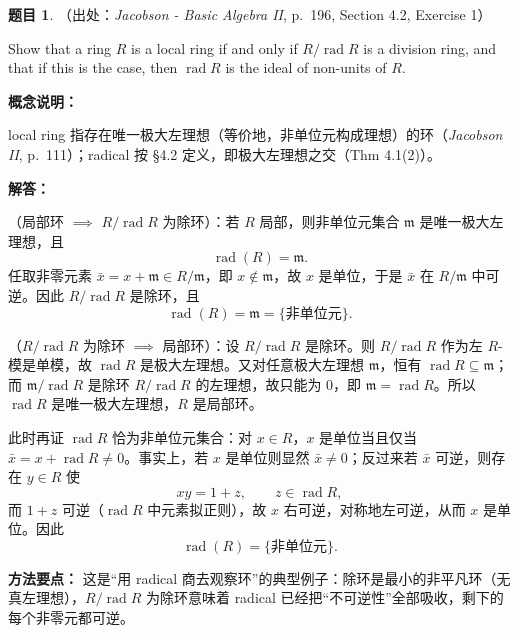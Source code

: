 \documentclass[a4paper]{ctexart}
\theoremstyle{definition}
\newtheorem{example}{题目}[section]
\theoremstyle{analysis}
\theoremstyle{plain}
\begin{document}
\begin{example}
（出处：\textit{Jacobson - Basic Algebra II}, p.~196, Section 4.2, Exercise 1）

Show that a ring \(R\) is a local ring if and only if \(R/\operatorname{rad}R\) is a division ring, and that if this is the case, then \(\operatorname{rad}R\) is the ideal of non-units of \(R\).

\textbf{概念说明：}

local ring 指存在唯一极大左理想（等价地，非单位元构成理想）的环（\textit{Jacobson II}, p.~111）；radical 按 \S 4.2 定义，即极大左理想之交（Thm 4.1(2)）。

\textbf{解答：}

（局部环 \(\implies\) \(R/\operatorname{rad}R\) 为除环）：若 \(R\) 局部，则非单位元集合 \(\mathfrak m\) 是唯一极大左理想，且
\[
  \operatorname{rad}(R)=\mathfrak m.
\]
任取非零元素 \(\bar x=x+\mathfrak m\in R/\mathfrak m\)，即 \(x\notin\mathfrak m\)，故 \(x\) 是单位，于是 \(\bar x\) 在 \(R/\mathfrak m\) 中可逆。因此 \(R/\operatorname{rad}R\) 是除环，且
\[
  \operatorname{rad}(R)=\mathfrak m=\{\text{非单位元}\}.
\]

（\(R/\operatorname{rad}R\) 为除环 \(\implies\) 局部环）：设 \(R/\operatorname{rad}R\) 是除环。则 \(R/\operatorname{rad}R\) 作为左 \(R\)-模是单模，故 \(\operatorname{rad}R\) 是极大左理想。又对任意极大左理想 \(\mathfrak m\)，恒有 \(\operatorname{rad}R\subseteq\mathfrak m\)；而 \(\mathfrak m/\operatorname{rad}R\) 是除环 \(R/\operatorname{rad}R\) 的左理想，故只能为 \(0\)，即 \(\mathfrak m=\operatorname{rad}R\)。所以 \(\operatorname{rad}R\) 是唯一极大左理想，\(R\) 是局部环。

此时再证 \(\operatorname{rad}R\) 恰为非单位元集合：对 \(x\in R\)，\(x\) 是单位当且仅当 \(\bar x=x+\operatorname{rad}R\neq 0\)。事实上，若 \(x\) 是单位则显然 \(\bar x\neq 0\)；反过来若 \(\bar x\) 可逆，则存在 \(y\in R\) 使
\[
  xy=1+z,\qquad z\in\operatorname{rad}R,
\]
而 \(1+z\) 可逆（\(\operatorname{rad}R\) 中元素拟正则），故 \(x\) 右可逆，对称地左可逆，从而 \(x\) 是单位。因此
\[
  \operatorname{rad}(R)=\{\text{非单位元}\}.
\]

\textbf{方法要点：}
这是“用 radical 商去观察环”的典型例子：除环是最小的非平凡环（无真左理想），\(R/\operatorname{rad}R\) 为除环意味着 radical 已经把“不可逆性”全部吸收，剩下的每个非零元都可逆。
\end{example}
\end{document}
